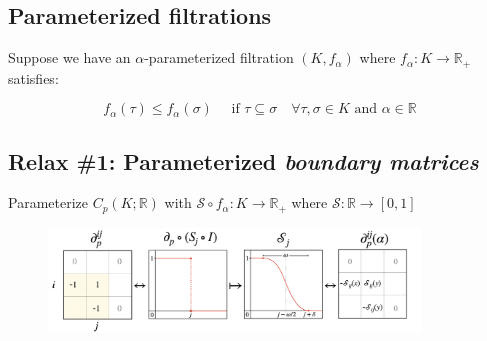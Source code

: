 \documentclass[
  letterpaper,
  DIV=11,
  numbers=noendperiod,
  oneside]{scrartcl}
\begin{document}
\subsection{Parameterized filtrations}\label{parameterized-filtrations}

Suppose we have an \(\alpha\)-parameterized filtration \((K, f_\alpha)\)
where \(f_\alpha : K \to \mathbb{R}_+\) satisfies:

\[
f_\alpha(\tau) \leq f_\alpha(\sigma) \quad \text{ if } \tau \subseteq \sigma \quad \forall \tau,\sigma \in K \text{ and } \alpha \in \mathbb{R}
\]

\begin{figure}

\begin{minipage}[t]{0.50\linewidth}

{\centering 


}

\end{minipage}%
%
\begin{minipage}[t]{0.50\linewidth}

{\centering 


}

\end{minipage}%

\end{figure}

\subsection{\texorpdfstring{\textbf{Relax \#1}: Parameterized
\emph{boundary
matrices}}{Relax \#1: Parameterized boundary matrices}}\label{relax-1-parameterized-boundary-matrices}

Parameterize \(C_p(K; \mathbb{R})\) with
\(\mathcal{S} \circ f_\alpha : K \to \mathbb{R}_+\) where
\(\mathcal{S}: \mathbb{R} \to [0,1]\)

\begin{figure}

{\centering \includegraphics[width=0.88\textwidth,height=1\textheight]{images/smoothstep_3.jpeg}

}

\end{figure}
\end{document}
